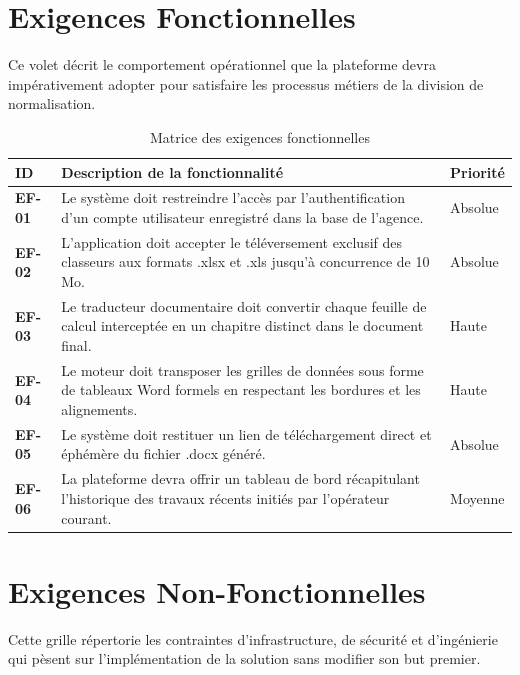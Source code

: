 \documentclass[12pt,a4paper,twoside]{report}
\begin{document}
\section{Exigences Fonctionnelles}
Ce volet décrit le comportement opérationnel que la plateforme devra impérativement adopter pour satisfaire les processus métiers de la division de normalisation.

\begin{table}[h]
\centering
\renewcommand{\arraystretch}{1.5}
\begin{tabular}{@{} p{2cm} p{10cm} p{2.5cm} @{}}
\toprule
\textbf{ID} & \textbf{Description de la fonctionnalité} & \textbf{Priorité} \\
\midrule
\textbf{EF-01} & Le système doit restreindre l'accès par l'authentification d'un compte utilisateur enregistré dans la base de l'agence. & Absolue \\
\textbf{EF-02} & L'application doit accepter le téléversement exclusif des classeurs aux formats .xlsx et .xls jusqu'à concurrence de 10 Mo. & Absolue \\
\textbf{EF-03} & Le traducteur documentaire doit convertir chaque feuille de calcul interceptée en un chapitre distinct dans le document final. & Haute \\
\textbf{EF-04} & Le moteur doit transposer les grilles de données sous forme de tableaux Word formels en respectant les bordures et les alignements. & Haute \\
\textbf{EF-05} & Le système doit restituer un lien de téléchargement direct et éphémère du fichier .docx généré. & Absolue \\
\textbf{EF-06} & La plateforme devra offrir un tableau de bord récapitulant l'historique des travaux récents initiés par l'opérateur courant. & Moyenne \\
\bottomrule
\end{tabular}
\caption{Matrice des exigences fonctionnelles}
\end{table}

\section{Exigences Non-Fonctionnelles}
Cette grille répertorie les contraintes d'infrastructure, de sécurité et d'ingénierie qui pèsent sur l'implémentation de la solution sans modifier son but premier.
\end{document}

